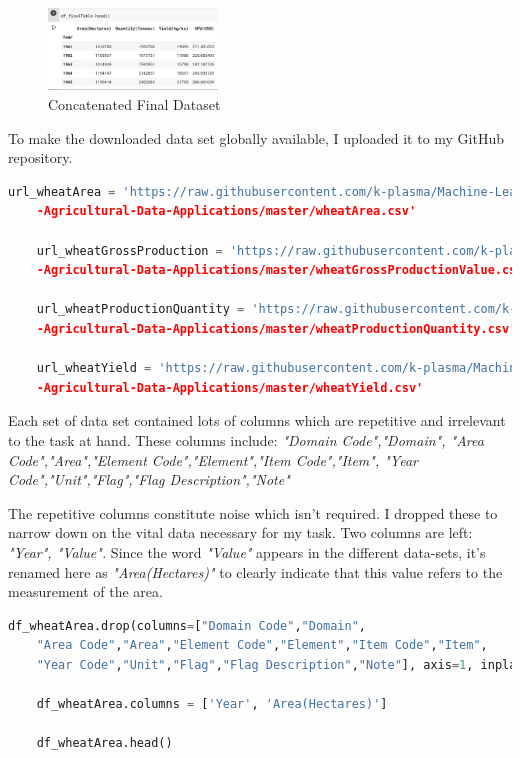 \begin{figure}[h!]
	\centering
	\includegraphics[width=0.4\textwidth,height=\textheight,keepaspectratio]{fig/finaltable.png}
	\caption{Concatenated Final Dataset}
	\label{fig:CFD}
\end{figure}


To make the downloaded data set globally available, I uploaded it to my GitHub repository.\cite{adeyemo_2020}

\begin{lstlisting}[language=Python]
	url_wheatArea = 'https://raw.githubusercontent.com/k-plasma/Machine-Learning-Models-for
	-Agricultural-Data-Applications/master/wheatArea.csv'	
	
	url_wheatGrossProduction = 'https://raw.githubusercontent.com/k-plasma/Machine-Learning-Models-for
	-Agricultural-Data-Applications/master/wheatGrossProductionValue.csv'	
	
	url_wheatProductionQuantity = 'https://raw.githubusercontent.com/k-plasma/Machine-Learning-Models-for
	-Agricultural-Data-Applications/master/wheatProductionQuantity.csv'	
	
	url_wheatYield = 'https://raw.githubusercontent.com/k-plasma/Machine-Learning-Models-for
	-Agricultural-Data-Applications/master/wheatYield.csv'
\end{lstlisting}




Each set of data set contained lots of columns which are repetitive and irrelevant to the task at hand. These columns include: \textit{"Domain Code","Domain",
	"Area Code","Area","Element Code","Element","Item Code","Item",
	"Year Code","Unit","Flag","Flag Description","Note"}


The repetitive columns constitute noise which isn't required. I dropped these to narrow down on the vital data necessary for my task. Two columns are left: \textit{"Year", "Value".} Since the word \textit{"Value"} appears in the different data-sets, it's renamed here as \textit{"Area(Hectares)"} to clearly indicate that this value refers to the measurement of the area.


\begin{lstlisting}[language=Python]
	df_wheatArea.drop(columns=["Domain Code","Domain",
	"Area Code","Area","Element Code","Element","Item Code","Item",
	"Year Code","Unit","Flag","Flag Description","Note"], axis=1, inplace=True)
	
	df_wheatArea.columns = ['Year', 'Area(Hectares)'] 
	
	df_wheatArea.head()
\end{lstlisting}

